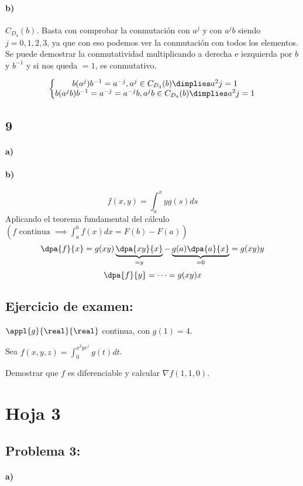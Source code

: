 \documentclass{apuntes}
\begin{document}
\paragraph{b)}
$C_{D_4}(b)$. Basta con comprobar la conmutación con $a^j$ y con $a^jb$ siendo $j = 0,1,2,3$, ya que con eso podemos ver la conmutación con todos los elementos. Se puede demostrar la conmutatividad multiplicando a derecha e iezquierda por $b$ y $b^{-1}$ y si nos queda $=1$, es conmutativo.

$$\left\{\begin{matrix}b(a^j)b^{-1} = a^{-j}, a^j \in C_{D_4}(b) \dimplies a^2j = 1\\
b(a^jb)b^{-1} = a^{-j} = a^{-j}b, a^jb \in C_{D_4}(b) \dimplies a^2j = 1\end{matrix}\right.$$

\subsection{9}
\paragraph{a)}
\paragraph{b)}

$$f(x,y) = \int_a^xy g(s)ds$$
Aplicando el teorema fundamental del cálculo $\left(f \text{ continua } \implies\displaystyle\int_a^b f(x)dx = F(b)-F(a)\right)$
$$\dpa{f}{x} = g(xy)\underbrace{\dpa{xy}{x}}_{=y} - \underbrace{g(a)\dpa{a}{x}}_{=0}  = g(xy)y$$
$$\dpa{f}{y} = \cdots  = g(xy)x$$

\subsection{Ejercicio de examen:}
$\appl{g}{\real}{\real}$ continua, con $g(1) = 4$.

Sea $f(x,y,z)=\displaystyle \int_0^{x^2ye^z} g(t)dt$.

Demostrar que $f$ es diferenciable y calcular $\nabla f(1,1,0)$.

\section{Hoja 3}
\subsection{Problema 3:}
\paragraph{a)}
\end{document}
